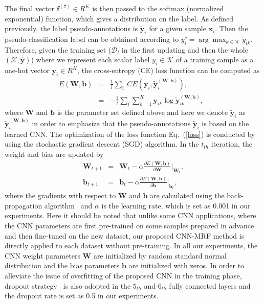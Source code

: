 \documentclass[journal]{IEEEtran}
\begin{document}
	The final vector $\mathbf{f}^{(7)}\in R^{K}$ is then passed to the softmax (normalized exponential) function, which gives a distribution on the label. As defined previously, the label {{pseudo-annotations}} is $\widetilde{\mathbf{y}}_{i}$ for a given sample $\mathbf{x}_{i}$. Then the {{pseudo-classification}} label can be obtained according to $y_{i}^{c}=\arg\max_{k\in\mathcal{K}} \widetilde{y}_{ik}$. Therefore, given the training set {{($\mathbf{\mathcal{D}}_{l}$ in the first updating and then the whole $(\mathbf{\mathcal{X}},\widehat{\mathbf{y}})$)}} where we represent each scalar label $y_i\in\mathcal{K}$ of a training sample as a one-hot vector $\mathbf{y}_{i}\in R^{K}$, the cross-entropy (CE) loss function can be computed as
	{{ \begin{eqnarray}\label{loss}
			E(\mathbf{W},\mathbf{b})&=& \frac{1}{l}\sum_{i}~CE(\mathbf{y}_{i},\widetilde{\mathbf{y}}_{i}^{(\mathbf{W},\mathbf{b})}),\nonumber \\
			&=& -\frac{1}{l}\sum_{i}\sum_{k=1}^{K}\mathbf{y}_{ik}\log{\widetilde{\mathbf{y}}_{ik}^{(\mathbf{W},\mathbf{b})}},~~~
			\end{eqnarray}}}where $\mathbf{W}$ and $\mathbf{b}$ is the parameter set defined above {{and here we denote $\widetilde{\mathbf{y}}_{i}$ as $\widetilde{\mathbf{y}}_{i}^{(\mathbf{W},\mathbf{b})}$ in order to emphasize that the pseudo-annotations $\widetilde{\mathbf{y}}_{i}$ is based on the learned CNN.}} The optimization of the loss function Eq.\ (\ref{loss}) is conducted by using the stochastic gradient descent (SGD) algorithm. In the $t_{th}$ iteration, the weight and bias are updated by
	\begin{eqnarray}
	\mathbf{W}_{t+1}&=& \mathbf{W}_{t} - \alpha\frac{\partial E(\mathbf{W},\mathbf{b})}{\partial \mathbf{W}}|_{\mathbf{W}_{t}},\\
	\mathbf{b}_{t+1}&=& \mathbf{b}_{t} - \alpha\frac{\partial E(\mathbf{W},\mathbf{b})}{\partial \mathbf{b}}|_{\mathbf{b}_{t}},
	\end{eqnarray}
	where the gradients with respect to $\mathbf{W}$ and $\mathbf{b}$ are calculated using the back-propagation algorithm~\cite{rumelhart1985learning} and $\alpha$ is the learning rate, which is set as 0.001 in our experiments. {{Here it should be noted that unlike some CNN applications, where the CNN parameters are first pre-trained on some samples prepared in advance and then fine-tuned on the new dataset, our proposed CNN-MRF method is directly applied to each dataset without pre-training. In all our experiments, the CNN weight parameters $\mathbf{W}$ are initialized by random standard normal distribution and the bias parameters $\mathbf{b}$ are initialized with zeros.}} In order to alleviate the issue of overfitting of the proposed CNN in the training phase, dropout strategy~\cite{srivastava2014dropout} is also adopted in the $5_{th}$ and $6_{th}$ fully connected layers and the dropout rate is set as 0.5 in our experiments.
	
\end{document}
